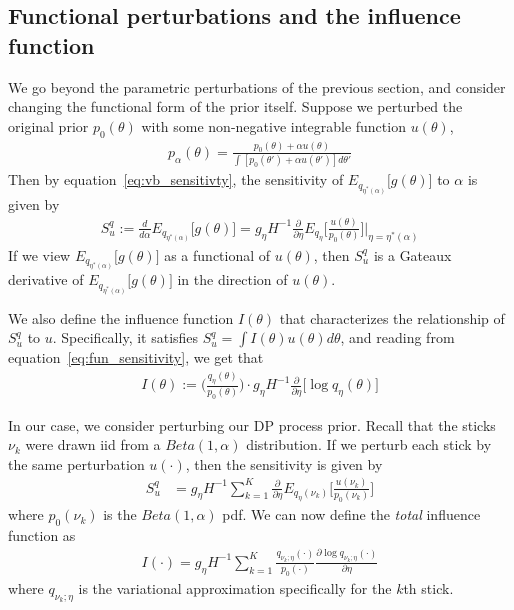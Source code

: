 \documentclass[a4paper]{article}
\begin{document}
\subsection{Functional perturbations and the influence function}
We go beyond the parametric perturbations of the previous section, and consider changing the functional
form of the prior itself. Suppose we perturbed the original prior $p_0(\theta)$ with some non-negative integrable
function $u(\theta)$,
\begin{align}
  p_\alpha(\theta) = \frac{p_0(\theta) + \alpha u(\theta)}{\int [p_0(\theta') + \alpha u(\theta')] d\theta'}
\end{align}
Then by equation~\ref{eq:vb_sensitivty}, the sensitivity of $E_{q_{\eta^*(\alpha)}} \big[g(\theta)\big]$ to $\alpha$ is
given by
\begin{align}
  S_u^q := \frac{d}{d\alpha} E_{q_{\eta^*(\alpha)}} \big[g(\theta)\big] = g_\eta H^{-1} \frac{\partial}{\partial\eta}E_{q_\eta}\Big[ \frac{u(\theta)}{p_0(\theta)}\Big]\Big|_{\eta = \eta^*(\alpha)}
  \label{eq:fun_sensitivity}
\end{align}
If we view $E_{q_{\eta^*(\alpha)}} \big[g(\theta)\big]$ as a functional of $u(\theta)$, then $S_u^q$ is a Gateaux derivative
of $E_{q_{\eta^*(\alpha)}} \big[g(\theta)\big]$ in the direction of $u(\theta)$.

We also define the influence function $I(\theta)$ that characterizes the relationship of $S_u^q$ to $u$. Specifically, it satisfies
$S_u^q = \int I(\theta) u(\theta) d\theta$, and reading from equation~\ref{eq:fun_sensitivity}, we get that
\begin{align}
  I(\theta) := \Big(\frac{q_\eta (\theta)}{p_0(\theta)}\Big) \cdot
  g_\eta H^{-1} \frac{\partial}{\partial \eta} \Big[\log q_\eta(\theta)\Big]
\end{align}

In our case, we consider perturbing our DP process prior. Recall that the sticks $\nu_k$ were drawn iid
from a $Beta(1, \alpha)$ distribution. If we perturb each stick by the same perturbation $u(\cdot)$, then the sensitivity is given by
\begin{align}
S_u^q &=
g_\eta H^{-1} \sum_{k = 1}^K \frac{\partial}{\partial \eta} E_{q_\eta(\nu_k)}\Big[\frac{u(\nu_k)}{p_0(\nu_k)} \Big]
\end{align}
where $p_0(\nu_k)$ is the $Beta(1, \alpha)$ pdf. We can now define the {\itshape total} influence function as
\begin{align}
I(\cdot) = g_\eta H^{-1} \sum_{k = 1}^K \frac{q_{\nu_k; \eta}(\cdot)}{p_0(\cdot)}\frac{\partial\log q_{\nu_k; \eta}(\cdot)}{\partial \eta}
\label{eq:total_influence}
\end{align}
where $q_{\nu_k; \eta}$ is the variational approximation specifically for the $k$th stick.
\end{document}
